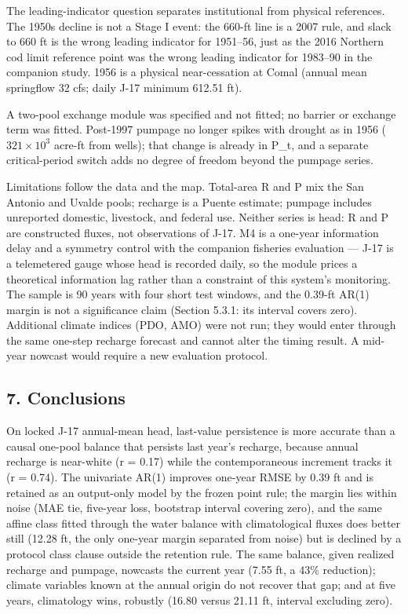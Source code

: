 \documentclass[11pt]{article}
\begin{document}
The leading-indicator question separates institutional from physical
references. The 1950s decline is not a Stage I event: the 660-ft line is
a 2007 rule, and slack to 660 ft is the wrong leading indicator for
1951--56, just as the 2016 Northern cod limit reference point was the
wrong leading indicator for 1983--90 in the companion study. 1956 is a
physical near-cessation at Comal (annual mean springflow 32 cfs; daily
J-17 minimum 612.51 ft).

A two-pool exchange module was specified and not fitted; no barrier or
exchange term was fitted. Post-1997 pumpage no longer spikes with
drought as in 1956 (\(321 \times 10^3\) acre-ft from wells); that change
is already in P\_t, and a separate critical-period switch adds no degree
of freedom beyond the pumpage series.

Limitations follow the data and the map. Total-area R and P mix the San
Antonio and Uvalde pools; recharge is a Puente estimate; pumpage
includes unreported domestic, livestock, and federal use. Neither series
is head: R and P are constructed fluxes, not observations of J-17. M4 is
a one-year information delay and a symmetry control with the companion
fisheries evaluation --- J-17 is a telemetered gauge whose head is
recorded daily, so the module prices a theoretical information lag
rather than a constraint of this system's monitoring. The sample is 90
years with four short test windows, and the 0.39-ft AR(1) margin is not
a significance claim (Section 5.3.1: its interval covers zero).
Additional climate indices (PDO, AMO) were not run; they would enter
through the same one-step recharge forecast and cannot alter the timing
result. A mid-year nowcast would require a new evaluation protocol.

\subsection{7. Conclusions}\label{conclusions}

On locked J-17 annual-mean head, last-value persistence is more accurate
than a causal one-pool balance that persists last year's recharge,
because annual recharge is near-white (r = 0.17) while the
contemporaneous increment tracks it (r = 0.74). The univariate AR(1)
improves one-year RMSE by 0.39 ft and is retained as an output-only
model by the frozen point rule; the margin lies within noise (MAE tie,
five-year loss, bootstrap interval covering zero), and the same affine
class fitted through the water balance with climatological fluxes does
better still (12.28 ft, the only one-year margin separated from noise)
but is declined by a protocol class clause outside the retention rule.
The same balance, given realized recharge and pumpage, nowcasts the
current year (7.55 ft, a 43\% reduction); climate variables known at the
annual origin do not recover that gap; and at five years, climatology
wins, robustly (16.80 versus 21.11 ft, interval excluding zero).
\end{document}
